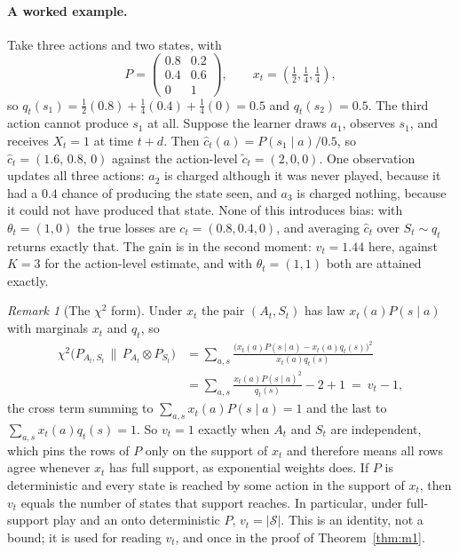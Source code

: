 \documentclass{article}
\theoremstyle{remark}
\newtheorem{remark}{Remark}
\newcommand{\Sset}{\mathcal{S}}
\begin{document}
\paragraph{A worked example.} Take three actions and two states, with
\[
P=\begin{pmatrix}0.8&0.2\\0.4&0.6\\0&1\end{pmatrix},
\qquad x_t=(\tfrac12,\tfrac14,\tfrac14),
\]
so $q_t(s_1)=\tfrac12(0.8)+\tfrac14(0.4)+\tfrac14(0)=0.5$ and $q_t(s_2)=0.5$. The third action
cannot produce $s_1$ at all. Suppose the learner draws $a_1$, observes $s_1$, and receives $X_t=1$
at time $t+d$. Then $\hat c_t(a)=P(s_1\mid a)/0.5$, so
$\hat c_t=(1.6,\,0.8,\,0)$ against the action-level $\tilde c_t=(2,0,0)$. One observation updates
all three actions: $a_2$ is charged although it was never played, because it had a $0.4$ chance of
producing the state seen, and $a_3$ is charged nothing, because it could not have produced that
state. None of this introduces bias: with $\theta_t=(1,0)$ the true losses are
$c_t=(0.8,0.4,0)$, and averaging $\hat c_t$ over $S_t\sim q_t$ returns exactly that. The gain is in the second moment:
$v_t=1.44$ here, against $K=3$ for the action-level estimate, and with $\theta_t=(1,1)$ both are
attained exactly.

\begin{remark}[The $\chi^2$ form]\label{rem:chi2}
Under $x_t$ the pair $(A_t,S_t)$ has law $x_t(a)P(s\mid a)$ with marginals $x_t$ and $q_t$, so
\begin{align*}
\chi^2\bigl(P_{A_t,S_t}\,\big\|\,P_{A_t}\!\otimes\!P_{S_t}\bigr)
&=\sum_{a,s}\frac{\bigl(x_t(a)P(s\mid a)-x_t(a)q_t(s)\bigr)^2}{x_t(a)q_t(s)}\\
&=\sum_{a,s}\frac{x_t(a)P(s\mid a)^2}{q_t(s)}-2+1\ =\ v_t-1,
\end{align*}
the cross term summing to $\sum_{a,s}x_t(a)P(s\mid a)=1$ and the last to
$\sum_{a,s}x_t(a)q_t(s)=1$. So $v_t=1$ exactly when $A_t$ and $S_t$ are independent, which pins the rows of $P$ only on the
support of $x_t$ and therefore means all rows agree whenever $x_t$ has full support, as
exponential weights does. If $P$ is deterministic and every state is reached by some action in
the support of $x_t$, then $v_t$ equals the number of states that support reaches. In particular,
under full-support play and an onto deterministic $P$, $v_t=|\Sset|$. This is an identity, not a bound; it is used for reading $v_t$, and once in the proof of
Theorem~\ref{thm:m1}.
\end{remark}
\end{document}
